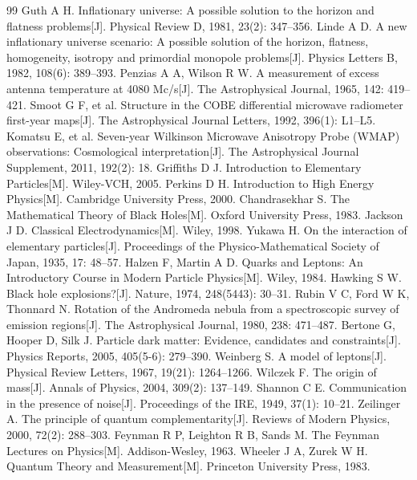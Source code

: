 \documentclass[12pt,a4paper]{ctexart}
\begin{document}
\begin{thebibliography}{99}
 Guth A H. Inflationary universe: A possible solution to the horizon and flatness problems[J]. Physical Review D, 1981, 23(2): 347–356.
 Linde A D. A new inflationary universe scenario: A possible solution of the horizon, flatness, homogeneity, isotropy and primordial monopole problems[J]. Physics Letters B, 1982, 108(6): 389–393.
 Penzias A A, Wilson R W. A measurement of excess antenna temperature at 4080 Mc/s[J]. The Astrophysical Journal, 1965, 142: 419–421.
 Smoot G F, et al. Structure in the COBE differential microwave radiometer first-year maps[J]. The Astrophysical Journal Letters, 1992, 396(1): L1–L5.
 Komatsu E, et al. Seven-year Wilkinson Microwave Anisotropy Probe (WMAP) observations: Cosmological interpretation[J]. The Astrophysical Journal Supplement, 2011, 192(2): 18.
 Griffiths D J. Introduction to Elementary Particles[M]. Wiley-VCH, 2005.
 Perkins D H. Introduction to High Energy Physics[M]. Cambridge University Press, 2000.
 Chandrasekhar S. The Mathematical Theory of Black Holes[M]. Oxford University Press, 1983.
 Jackson J D. Classical Electrodynamics[M]. Wiley, 1998.
 Yukawa H. On the interaction of elementary particles[J]. Proceedings of the Physico-Mathematical Society of Japan, 1935, 17: 48–57.
 Halzen F, Martin A D. Quarks and Leptons: An Introductory Course in Modern Particle Physics[M]. Wiley, 1984.
 Hawking S W. Black hole explosions?[J]. Nature, 1974, 248(5443): 30–31.
 Rubin V C, Ford W K, Thonnard N. Rotation of the Andromeda nebula from a spectroscopic survey of emission regions[J]. The Astrophysical Journal, 1980, 238: 471–487.
 Bertone G, Hooper D, Silk J. Particle dark matter: Evidence, candidates and constraints[J]. Physics Reports, 2005, 405(5-6): 279–390.
 Weinberg S. A model of leptons[J]. Physical Review Letters, 1967, 19(21): 1264–1266.
 Wilczek F. The origin of mass[J]. Annals of Physics, 2004, 309(2): 137–149.
 Shannon C E. Communication in the presence of noise[J]. Proceedings of the IRE, 1949, 37(1): 10–21.
 Zeilinger A. The principle of quantum complementarity[J]. Reviews of Modern Physics, 2000, 72(2): 288–303.
 Feynman R P, Leighton R B, Sands M. The Feynman Lectures on Physics[M]. Addison-Wesley, 1963.
 Wheeler J A, Zurek W H. Quantum Theory and Measurement[M]. Princeton University Press, 1983.

\end{thebibliography}
\end{document}
